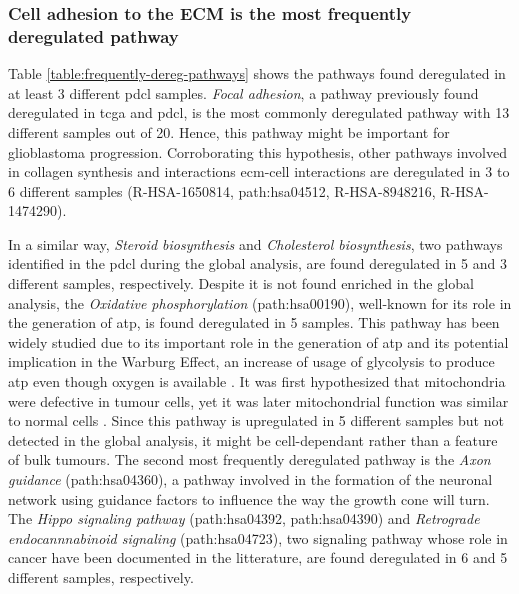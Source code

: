 \subsubsection{Cell adhesion to the ECM is the most frequently deregulated pathway}

Table \ref*{table:frequently-dereg-pathways} shows the pathways found deregulated in at least 3 different \acrshort{pdcl} samples.
\textit{Focal adhesion}, a pathway previously found deregulated in \acrshort{tcga} and \acrshort{pdcl}, is the most commonly deregulated pathway with 13 different samples out of 20.
Hence, this pathway might be important for glioblastoma progression.
Corroborating this hypothesis, other pathways involved in collagen synthesis and interactions \acrshort{ecm}-cell interactions are deregulated in 3 to 6 different samples (R-HSA-1650814, path:hsa04512, R-HSA-8948216, R-HSA-1474290).

In a similar way, \textit{Steroid biosynthesis} and \textit{Cholesterol biosynthesis}, two pathways identified in the \acrshort{pdcl} during the global analysis, are found deregulated in 5 and 3 different samples, respectively.
Despite it is not found enriched in the global analysis, the \textit{Oxidative phosphorylation} (path:hsa00190), well-known for its role in the generation of \acrshort{atp}, is found deregulated in 5 samples.
This pathway has been widely studied due to its important role in the generation of \acrshort{atp} and its potential implication in the Warburg Effect, an increase of usage of glycolysis to produce \acrshort{atp} even though oxygen is available \cite*{Spinicci2022}.
It was first hypothesized that mitochondria were defective in tumour cells, yet it was later mitochondrial function was similar to normal cells \cite*{Cairns2011}.
Since this pathway is upregulated in 5 different samples but not detected in the global analysis, it might be cell-dependant rather than a feature of bulk tumours.
The second most frequently deregulated pathway is the \textit{Axon guidance} (path:hsa04360), a pathway involved in the formation of the neuronal network using guidance factors to influence the way the growth cone will turn.
The \textit{Hippo signaling pathway} (path:hsa04392, path:hsa04390) and \textit{Retrograde endocannnabinoid signaling} (path:hsa04723), two signaling pathway whose role in cancer have been documented in the litterature, are found deregulated in 6 and 5 different samples, respectively.

